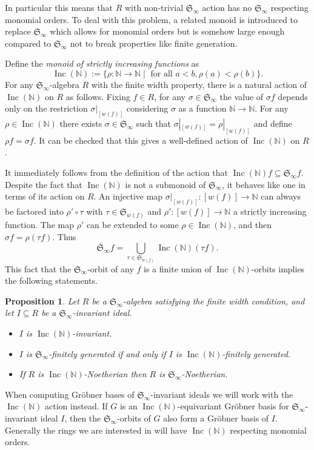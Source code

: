 \documentclass{article}
\theoremstyle{plain}
\newtheorem{proposition}[theorem]{Proposition}
\theoremstyle{definition}
\numberwithin{equation}{section}
\newcommand{\B}[1]{\mathbb #1}
\newcommand{\F}[1]{\mathfrak #1}
\newcommand{\Inc}{\operatorname{Inc}(\B N)}
\newcommand{\Sym}{\F S_\infty}
\begin{document}
In particular this means that $R$ with non-trivial $\Sym$ action has no $\Sym$ respecting monomial orders.  To deal with this problem, a related monoid is introduced to replace $\Sym$ which allows for monomial orders but is somehow large enough compared to $\Sym$ not to break properties like finite generation.

Define the {\em monoid of strictly increasing functions} as
\[ \Inc := \{ \rho:\B N \to \B N \mid \text{ for all } a < b, \rho(a) < \rho(b) \}. \]
For any $\Sym$-algebra $R$ with the finite width property, there is a natural action of $\Inc$ on $R$ as follows.  Fixing $f \in R$, for any $\sigma \in \Sym$ the value of $\sigma f$ depends only on the restriction $\sigma|_{[w(f)]}$ considering $\sigma$ as a function $\B N \to \B N$.  For any $\rho \in \Inc$ there exists $\sigma \in \Sym$ such that $\sigma|_{[w(f)]} = \rho|_{[w(f)]}$ and define $\rho f = \sigma f$.  It can be checked that this gives a well-defined action of $\Inc$ on $R$.

It immediately follows from the definition of the action that $\Inc f \subseteq \Sym f$.  Despite the fact that $\Inc$ is not a submonoid of $\Sym$, it behaves like one in terms of its action on $R$.  An injective map $\sigma|_{[w(f)]}: [w(f)] \to \B N$ can always be factored into $\rho' \circ \tau$ with $\tau \in \F S_{w(f)}$ and $\rho':[w(f)] \to \B N$ a strictly increasing function.  The map $\rho'$ can be extended to some $\rho \in \Inc$, and then $\sigma f = \rho (\tau f)$.  Thus
 \[ \Sym f = \bigcup_{\tau \in \F S_{w(f)}} \Inc(\tau f). \]
This fact that the $\Sym$-orbit of any $f$ is a finite union of $\Inc$-orbits implies the following statements.

\begin{proposition}
 Let $R$ be a $\Sym$-algebra satisfying the finite width condition, and let $I\subseteq R$ be a $\Sym$-invariant ideal.
 \begin{itemize}
  \item $I$ is $\Inc$-invariant.
  \item $I$ is $\Sym$-finitely generated if and only if $I$ is $\Inc$-finitely generated.
  \item If $R$ is $\Inc$-Noetherian then $R$ is $\Sym$-Noetherian.
 \end{itemize}
\end{proposition}

When computing Gr\"obner bases of $\Sym$-invariant ideals we will work with the $\Inc$ action instead.  If $G$ is an $\Inc$-equivariant Gr\"obner basis for $\Sym$-invariant ideal $I$, then the $\Sym$-orbits of $G$ also form a Gr\"obner basis of $I$.  Generally the rings we are interested in will have $\Inc$ respecting monomial orders.
\end{document}
